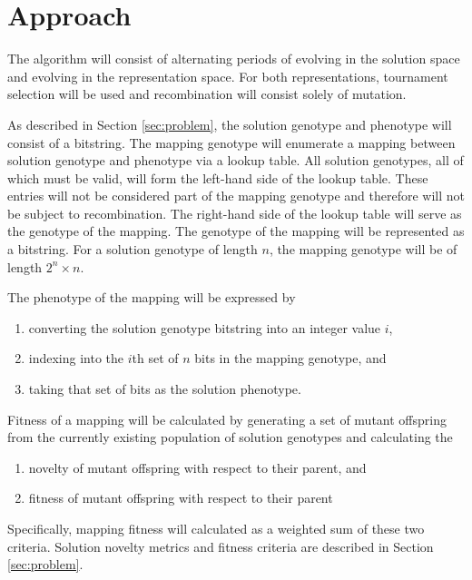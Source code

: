 \section{Approach} \label{sec:approach}

The algorithm will consist of alternating periods of evolving in the solution space and evolving in the representation space.
For both representations, tournament selection will be used and recombination will consist solely of mutation.

As described in Section \ref{sec:problem}, the solution genotype and phenotype will consist of a bitstring.
The mapping genotype will enumerate a mapping between solution genotype and phenotype via a lookup table.
All solution genotypes, all of which must be valid, will form the left-hand side of the lookup table.
These entries will not be considered part of the mapping genotype and therefore will not be subject to recombination.
The right-hand side of the lookup table will serve as the genotype of the mapping.
The genotype of the mapping will be represented as a bitstring.
For a solution genotype of length $n$, the mapping genotype will be of length
$2^n \times n$.

The phenotype of the mapping will be expressed by
\begin{enumerate}
\item converting the solution genotype bitstring into an integer value $i$,
\item indexing into the $i$th set of $n$ bits in the mapping genotype, and
\item taking that set of bits as the solution phenotype.
\end{enumerate}

Fitness of a mapping will be calculated by generating a set of mutant offspring from the currently existing population of solution genotypes and calculating the
\begin{enumerate}
\item novelty of mutant offspring with respect to their parent, and
\item fitness of mutant offspring with respect to their parent
\end{enumerate}
Specifically, mapping fitness will calculated as a weighted sum of these two criteria.
Solution novelty metrics and fitness criteria are described in Section \ref{sec:problem}.
